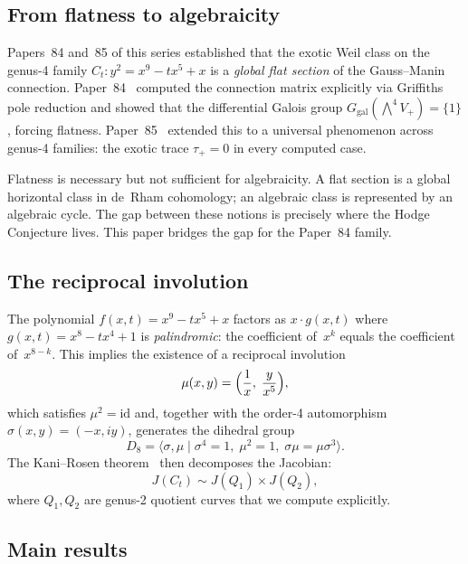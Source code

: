 \documentclass[11pt]{article}
\theoremstyle{plain}
\theoremstyle{definition}
\theoremstyle{remark}
\newcommand{\Ggal}{G_{\mathrm{gal}}}
\begin{document}
\subsection{From flatness to algebraicity}

Papers~84 and~85 of this series established that the exotic Weil
class on the genus-4 family $C_t\colon y^2 = x^9 - tx^5 + x$
is a \emph{global flat section} of the Gauss--Manin connection.
Paper~84~\cite{P84} computed the connection matrix explicitly via
Griffiths pole reduction and showed that the differential Galois
group $\Ggal(\bigwedge^4 V_+) = \{1\}$, forcing flatness.
Paper~85~\cite{P85} extended this to a universal phenomenon across
genus-4 families: the exotic trace $\tau_+ = 0$ in every computed
case.

Flatness is necessary but not sufficient for algebraicity.
A flat section is a global horizontal class in de~Rham cohomology;
an algebraic class is represented by an algebraic cycle.  The gap
between these notions is precisely where the Hodge Conjecture lives.
This paper bridges the gap for the Paper~84 family.

\subsection{The reciprocal involution}

The polynomial $f(x,t) = x^9 - tx^5 + x$ factors as $x \cdot g(x,t)$
where $g(x,t) = x^8 - tx^4 + 1$ is \emph{palindromic}: the
coefficient of~$x^k$ equals the coefficient of~$x^{8-k}$.  This
implies the existence of a reciprocal involution
\begin{equation}\label{eq:mu}
  \mu(x,y) = \Bigl(\frac{1}{x},\; \frac{y}{x^5}\Bigr),
\end{equation}
which satisfies $\mu^2 = \mathrm{id}$ and, together with the order-4
automorphism $\sigma(x,y) = (-x, iy)$, generates the dihedral group
\[
  D_8 = \langle \sigma, \mu \mid \sigma^4 = 1,\; \mu^2 = 1,\;
    \sigma\mu = \mu\sigma^3 \rangle.
\]
The Kani--Rosen theorem~\cite{KR89} then decomposes the Jacobian:
\begin{equation}\label{eq:splitting}
  J(C_t) \sim J(Q_1) \times J(Q_2),
\end{equation}
where $Q_1, Q_2$ are genus-2 quotient curves that we compute
explicitly.

\subsection{Main results}
\end{document}
